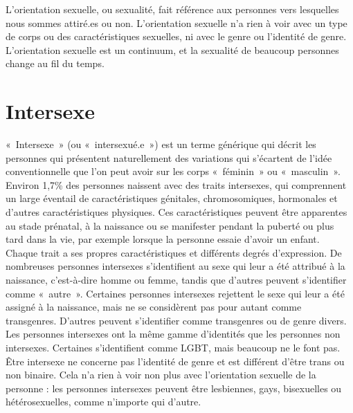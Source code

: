 \documentclass[12pt,openany]{book}
\begin{document}
L’orientation sexuelle, ou sexualité, fait référence aux personnes vers lesquelles nous sommes attiré.es ou non. L’orientation sexuelle n’a rien à voir avec un type de corps ou des caractéristiques sexuelles, ni avec le genre ou l’identité de genre. L’orientation sexuelle est un continuum, et la sexualité de beaucoup personnes change au fil du temps.

\section*{Intersexe}

\mbox{« Intersexe »} (ou \mbox{« intersexué.e »}) est un terme générique qui décrit les personnes qui présentent naturellement des variations qui s’écartent de l’idée conventionnelle que l’on peut avoir sur les corps \mbox{« féminin »} ou \mbox{« masculin »}. Environ 1,7\% des personnes naissent avec des traits intersexes, qui comprennent un large éventail de caractéristiques génitales, chromosomiques, hormonales et d’autres caractéristiques physiques. Ces caractéristiques peuvent être apparentes au stade prénatal, à la naissance ou se manifester pendant la puberté ou plus tard dans la vie, par exemple lorsque la personne essaie d’avoir un enfant.
Chaque trait a ses propres caractéristiques et différents degrés d’expression. De nombreuses personnes intersexes s’identifient au sexe qui leur a été attribué à la naissance, c’est-à-dire homme ou femme, tandis que d’autres peuvent s’identifier comme \mbox{« autre »}. Certaines personnes intersexes rejettent le sexe qui leur a été assigné à la naissance, mais ne se considèrent pas pour autant comme transgenres. D’autres peuvent s’identifier comme transgenres ou de genre divers. Les personnes intersexes ont la même gamme d’identités que les personnes non intersexes. Certaines s’identifient comme LGBT, mais beaucoup ne le font pas. Être intersexe ne concerne pas l’identité de genre et est différent d’être trans ou non binaire. Cela n’a rien à voir non plus avec l’orientation sexuelle de la personne : les personnes intersexes peuvent être lesbiennes, gays, bisexuelles ou hétérosexuelles, comme n’importe qui d’autre.

\bigskip
\end{document}
